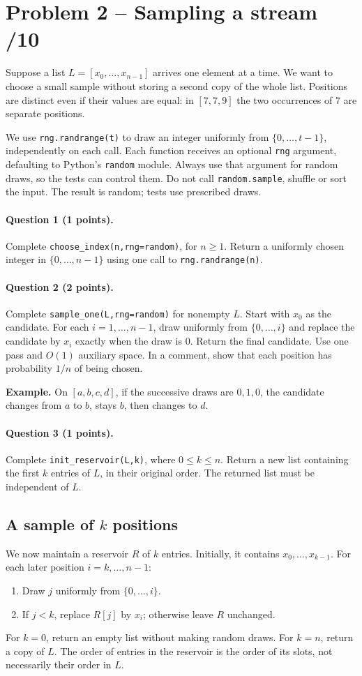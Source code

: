 \documentclass[11pt,a4paper]{article}
\newcommand{\q}[2]{\paragraph{Question #1 (#2 points).}}
\begin{document}
\section*{Problem 2 -- Sampling a stream \hfill /10}
Suppose a list $L=[x_0,\ldots,x_{n-1}]$ arrives one element at a time. We want to choose a small sample without storing a second copy of the whole list. Positions are distinct even if their values are equal: in $[7,7,9]$ the two occurrences of $7$ are separate positions.

We use \texttt{rng.randrange(t)} to draw an integer uniformly from $\{0,\ldots,t-1\}$, independently on each call. Each function receives an optional \texttt{rng} argument, defaulting to Python's \texttt{random} module. Always use that argument for random draws, so the tests can control them. Do not call \texttt{random.sample}, shuffle or sort the input. The result is random; tests use prescribed draws.
\q{1}{1} Complete \texttt{choose\_index(n,rng=random)}, for $n\ge1$. Return a uniformly chosen integer in $\{0,\ldots,n-1\}$ using one call to \texttt{rng.randrange(n)}.
\q{2}{2} Complete \texttt{sample\_one(L,rng=random)} for nonempty $L$. Start with $x_0$ as the candidate. For each $i=1,\ldots,n-1$, draw uniformly from $\{0,\ldots,i\}$ and replace the candidate by $x_i$ exactly when the draw is $0$. Return the final candidate. Use one pass and $O(1)$ auxiliary space. In a comment, show that each position has probability $1/n$ of being chosen.

\textbf{Example.} On $[a,b,c,d]$, if the successive draws are $0,1,0$, the candidate changes from $a$ to $b$, stays $b$, then changes to $d$.
\q{3}{1} Complete \texttt{init\_reservoir(L,k)}, where $0\le k\le n$. Return a new list containing the first $k$ entries of $L$, in their original order. The returned list must be independent of $L$.
\newpage
\subsection*{A sample of $k$ positions}
We now maintain a reservoir $R$ of $k$ entries. Initially, it contains $x_0,\ldots,x_{k-1}$. For each later position $i=k,\ldots,n-1$:
\begin{enumerate}[nosep]
\item Draw $j$ uniformly from $\{0,\ldots,i\}$.
\item If $j<k$, replace $R[j]$ by $x_i$; otherwise leave $R$ unchanged.
\end{enumerate}
For $k=0$, return an empty list without making random draws. For $k=n$, return a copy of $L$. The order of entries in the reservoir is the order of its slots, not necessarily their order in $L$.
\end{document}
